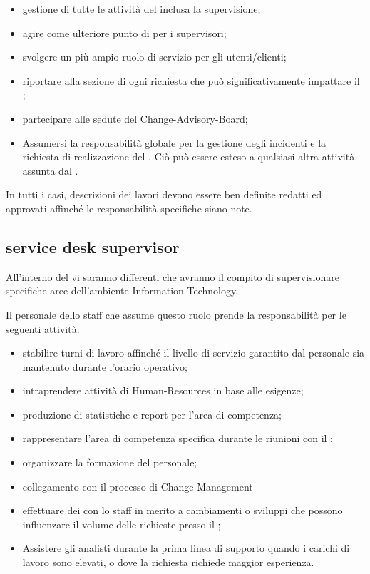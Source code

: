 \begin{itemize}
\item{gestione di tutte le attività del  inclusa la supervisione;}
\item{agire come ulteriore punto di  per i supervisori;}
\item{svolgere un più ampio ruolo di servizio per gli utenti/clienti;}
\item{riportare alla sezione di  ogni richiesta che può significativamente impattare il ;}
\item{partecipare alle sedute del \ac{Change-Advisory-Board};}
\item{Assumersi la responsabilità globale per la gestione degli incidenti e la richiesta di realizzazione del . Ciò può essere esteso a qualsiasi altra attività assunta dal .}
\end{itemize}

In tutti i casi, descrizioni dei lavori devono essere ben definite redatti ed approvati affinché le responsabilità specifiche siano note.

\subsection[Service Desk Supervisor]{service desk supervisor}
\label{sd-sd-supervisor}
All'interno del  vi saranno differenti  che avranno il compito di supervisionare specifiche aree dell'ambiente \acs{Information-Technology}.

Il personale dello staff che assume questo ruolo prende la responsabilità per le seguenti attività:

\begin{itemize}
\item{stabilire turni di lavoro affinché il livello di servizio garantito dal personale sia mantenuto durante l'orario operativo;}
\item{intraprendere attività di \ac{Human-Resources} in base alle esigenze;}
\item{produzione di statistiche e report per l'area di competenza;}
\item{rappresentare l'area di competenza specifica durante le riunioni con il ;}
\item{organizzare la formazione del personale;}
\item{collegamento con il processo di \ac{Change-Management}}
\item{effettuare dei  con lo staff in merito a cambiamenti o sviluppi che possono influenzare il volume delle richieste presso il ;}
\item{Assistere gli analisti durante la prima linea di supporto quando i carichi di lavoro sono elevati, o dove la richiesta richiede maggior esperienza.}
\end{itemize}

